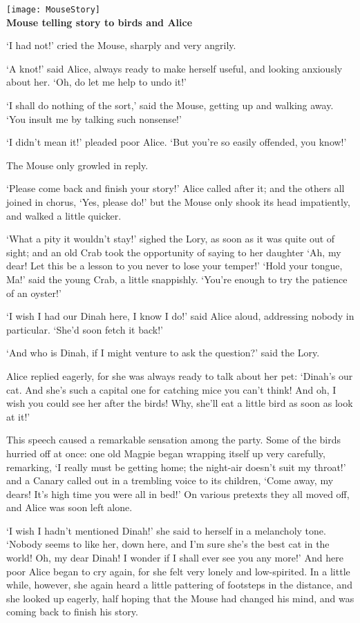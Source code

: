 \documentclass{article}
\begin{document}

\begin{center}
    \texttt{[image: MouseStory]}\\
    \textbf{Mouse telling story to birds and Alice}
\end{center}


`I had not!' cried the Mouse, sharply and very angrily.

`A knot!' said Alice, always ready to make herself useful, and looking anxiously about her. `Oh, do let me help to undo it!'

`I shall do nothing of the sort,' said the Mouse, getting up and walking away. `You insult me by talking such nonsense!'

`I didn't mean it!' pleaded poor Alice. `But you're so easily offended, you know!'

The Mouse only growled in reply.

`Please come back and finish your story!' Alice called after it; and the others all joined in chorus, `Yes, please do!' but the Mouse only shook its head impatiently, and walked a little quicker.

`What a pity it wouldn't stay!' sighed the Lory, as soon as it was quite out of sight; and an old Crab took the opportunity of saying to her daughter `Ah, my dear! Let this be a lesson to you never to lose your temper!' `Hold your tongue, Ma!' said the young Crab, a little snappishly. `You're enough to try the patience of an oyster!'

`I wish I had our Dinah here, I know I do!' said Alice aloud, addressing nobody in particular. `She'd soon fetch it back!'

`And who is Dinah, if I might venture to ask the question?' said the Lory.

Alice replied eagerly, for she was always ready to talk about her pet: `Dinah's our cat. And she's such a capital one for catching mice you can't think! And oh, I wish you could see her after the birds! Why, she'll eat a little bird as soon as look at it!'

This speech caused a remarkable sensation among the party. Some of the birds hurried off at once: one old Magpie began wrapping itself up very carefully, remarking, `I really must be getting home; the night-air doesn't suit my throat!' and a Canary called out in a trembling voice to its children, `Come away, my dears! It's high time you were all in bed!' On various pretexts they all moved off, and Alice was soon left alone.

`I wish I hadn't mentioned Dinah!' she said to herself in a melancholy tone. `Nobody seems to like her, down here, and I'm sure she's the best cat in the world! Oh, my dear Dinah! I wonder if I shall ever see you any more!' And here poor Alice began to cry again, for she felt very lonely and low-spirited. In a little while, however, she again heard a little pattering of footsteps in the distance, and she looked up eagerly, half hoping that the Mouse had changed his mind, and was coming back to finish his story.
\end{document}
